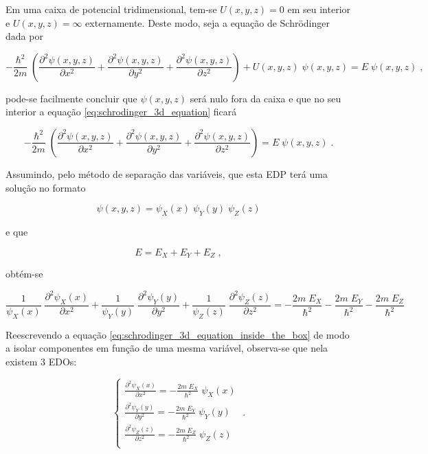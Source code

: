 Em uma caixa de potencial tridimensional, tem-se $U(x,y,z)=0$ em seu interior
e $U(x,y,z)=\infty$ externamente. Deste modo, seja a equação de Schrödinger
dada por

\begin{equation}
	-\frac{\hbar^{2}}{2m}\;\left(\frac{\partial^{2}\psi(x,y,z)}{\partial x^{2}}
	+ \frac{\partial^{2}\psi(x,y,z)}{\partial y^{2}}
	+ \frac{\partial^{2}\psi(x,y,z)}{\partial z^{2}}\right) + U(x,y,z)\;\psi(x,y,z)
	= E\;\psi(x,y,z)\;,
	\label{eq:schrodinger_3d_equation}
\end{equation}

\noindent pode-se facilmente concluir que $\psi(x,y,z)$ será nulo fora da
caixa e que no seu interior a equação \ref{eq:schrodinger_3d_equation} ficará

\begin{equation}
	-\frac{\hbar^{2}}{2m}\;\left(\frac{\partial^{2}\psi(x,y,z)}{\partial x^{2}}
	+ \frac{\partial^{2}\psi(x,y,z)}{\partial y^{2}}
	+ \frac{\partial^{2}\psi(x,y,z)}{\partial z^{2}}\right) = E\;\psi(x,y,z)\;.
\end{equation}

\noindent Assumindo, pelo método de separação das variáveis, que esta EDP terá
uma solução no formato

\begin{equation}
	\psi(x,y,z) = \psi_{X}(x)\;\psi_{Y}(y)\;\psi_{Z}(z)
\end{equation}

\noindent e que

\begin{equation}
	E = E_{X} + E_{Y} + E_{Z}\;,
\end{equation}

\noindent obtém-se

\begin{equation}
	\frac{1}{\psi_{X}(x)}\;\frac{\partial^{2}\psi_{X}(x)}{\partial x^{2}} +
	\frac{1}{\psi_{Y}(y)}\;\frac{\partial^{2}\psi_{Y}(y)}{\partial y^{2}} +
	\frac{1}{\psi_{Z}(z)}\;\frac{\partial^{2}\psi_{Z}(z)}{\partial z^{2}}
	= -\frac{2m\;E_{X}}{\hbar^{2}}
	-\frac{2m\;E_{Y}}{\hbar^{2}}
	-\frac{2m\;E_{Z}}{\hbar^{2}}
	\label{eq:schrodinger_3d_equation_inside_the_box}
\end{equation}

Reescrevendo a equação \ref{eq:schrodinger_3d_equation_inside_the_box} de modo
a isolar componentes em função de uma mesma variável, observa-se que nela
existem 3 EDOs:

\begin{equation}
	\begin{cases}
		\frac{\partial^{2}\psi_{X}(x)}{\partial x^{2}}
		= - \frac{2 m\;E_{X}}{\hbar^{2}}\;\psi_{X}(x) \\

		\frac{\partial^{2}\psi_{Y}(y)}{\partial y^{2}}
		= - \frac{2 m\;E_{Y}}{\hbar^{2}}\;\psi_{Y}(y) \\

		\frac{\partial^{2}\psi_{Z}(z)}{\partial z^{2}} = - \frac{2
		m\;E_{Z}}{\hbar^{2}}\;\psi_{Z}(z)             \\\end{cases}\;.
	\label{eq:schrodinger_3d_equation_inside_the_box_system_of_equations}
\end{equation}

